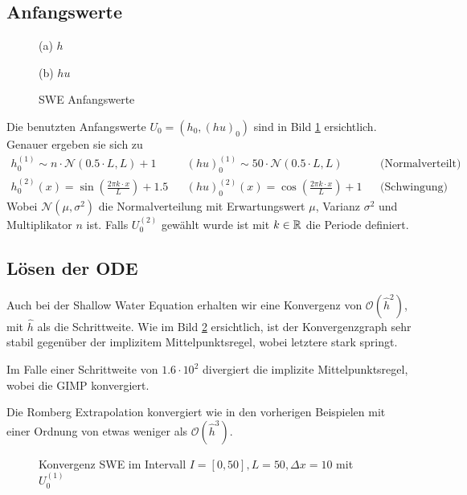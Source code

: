 \subsection{Anfangswerte}
\begin{figure}[H]
\footnotesize
\centering
\begin{minipage}[b]{0.49\linewidth}

\caption*{(a) $h$}
\end{minipage}
\begin{minipage}[b]{0.49\linewidth}

\caption*{(b) $hu$}
\end{minipage}
\caption{SWE Anfangswerte}
\label{fig:sweInitialValues}
\end{figure}
Die benutzten Anfangswerte $U_0 = (h_0,(hu)_0)$ sind in Bild \ref{fig:sweInitialValues} ersichtlich. Genauer ergeben sie sich zu
\[
\begin{aligned}
 h_0^{(1)} \sim n\cdot\mathcal N(0.5\cdot L,L) + 1 &&(hu)_0^{(1)}\sim 50\cdot\mathcal N(0.5\cdot L,L) && \text{(Normalverteilt)}\\
 h_0^{(2)}(x)= \sin\left( \frac{2\pi k\cdot x}{L}\right) + 1.5 &&(hu)_0^{(2)}(x) = \cos\left( \frac{2\pi k\cdot x}{L}\right) + 1  && \text{(Schwingung)}
\end{aligned}
\]
Wobei $\mathcal N(\mu, \sigma^2)$ die Normalverteilung mit Erwartungswert $\mu$, Varianz $\sigma^2$ und Multiplikator $n$ ist. Falls $U_0^{(2)}$ gewählt wurde ist mit $k\in \mathbb{R}$ die Periode definiert. 
\subsection{Lösen der ODE}
Auch bei der Shallow Water Equation erhalten wir eine Konvergenz von $\mathcal O(\hat h^2)$, mit $\hat h$ als die Schrittweite. Wie im Bild \ref{fig:sweConvergence} ersichtlich, ist der Konvergenzgraph sehr stabil gegenüber der implizitem Mittelpunktsregel, wobei letztere stark springt.

Im Falle einer Schrittweite von $1.6\cdot 10^2$ divergiert die implizite Mittelpunktsregel, wobei die GIMP konvergiert.

Die Romberg Extrapolation konvergiert wie in den vorherigen Beispielen mit einer Ordnung von etwas weniger als $\mathcal O(\hat h^3)$. 

\begin{figure}
\centering

\caption{Konvergenz SWE im Intervall $I = [0,50], L=50, \Delta x=10$ mit $U_0^{(1)}$}
\label{fig:sweConvergence}
\end{figure}

